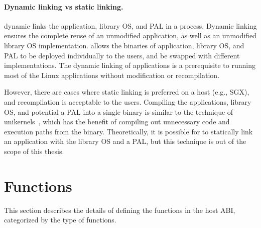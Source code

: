 \paragraph{Dynamic linking vs static linking.}
\graphene{} dynamic links the application, library OS, and PAL
in a process.
Dynamic linking ensures the complete reuse of an unmodified application,
as well as an unmodified library OS implementation.
\graphene{} allows the binaries of application, library OS, and PAL to be deployed individually to the users,
and be swapped with different implementations.
The dynamic linking of applications is a prerequisite
to running most of the Linux applications without modification or recompilation.



However, there are cases where static linking is preferred on a host (e.g., SGX), and recompilation is acceptable to the users.
Compiling the applications, library OS, and potential a PAL
into a single binary is similar to the technique of unikernels~\cite{unikernels},
which has the benefit of compiling out unnecessary code and execution paths
from the binary. 
Theoretically, it is possible for \graphene{} to statically link an application with the library OS and a PAL,
but this technique is out of the scope of this thesis.




\section{Functions}


This section describes
the details of defining the functions in the host ABI,
categorized by the type of functions.

